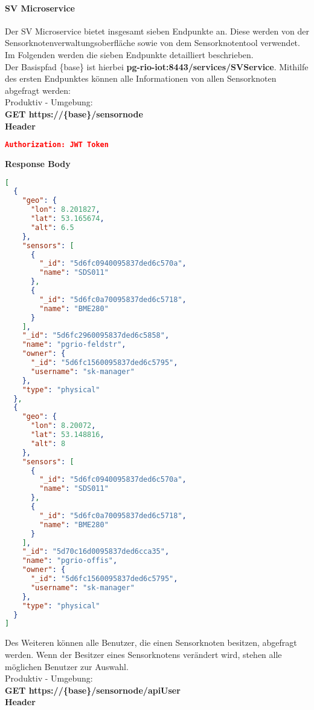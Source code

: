 \paragraph{SV Microservice}
Der SV Microservice bietet insgesamt sieben Endpunkte an.
Diese werden von der Sensorknotenverwaltungsoberfläche sowie von dem Sensorknotentool verwendet.
Im Folgenden werden die sieben Endpunkte detailliert beschrieben.
\\
Der Basispfad \{base\} ist hierbei \textbf{pg-rio-iot:8443/services/SVService}.
\newline
Mithilfe des ersten Endpunktes können alle Informationen von allen Sensorknoten abgefragt werden:
\\
Produktiv - Umgebung:
\\
\textbf{GET https://\{base\}/sensornode}
\\
\textbf{Header}
\begin{lstlisting}[language=json,firstnumber=1,basicstyle=\footnotesize]
Authorization: JWT Token
\end{lstlisting}
\textbf{Response Body}
\begin{lstlisting}[language=json,firstnumber=1,basicstyle=\footnotesize]
[
  {
    "geo": {
      "lon": 8.201827,
      "lat": 53.165674,
      "alt": 6.5
    },
    "sensors": [
      {
        "_id": "5d6fc0940095837ded6c570a",
        "name": "SDS011"
      },
      {
        "_id": "5d6fc0a70095837ded6c5718",
        "name": "BME280"
      }
    ],
    "_id": "5d6fc2960095837ded6c5858",
    "name": "pgrio-feldstr",
    "owner": {
      "_id": "5d6fc1560095837ded6c5795",
      "username": "sk-manager"
    },
    "type": "physical"
  },
  {
    "geo": {
      "lon": 8.20072,
      "lat": 53.148816,
      "alt": 8
    },
    "sensors": [
      {
        "_id": "5d6fc0940095837ded6c570a",
        "name": "SDS011"
      },
      {
        "_id": "5d6fc0a70095837ded6c5718",
        "name": "BME280"
      }
    ],
    "_id": "5d70c16d0095837ded6cca35",
    "name": "pgrio-offis",
    "owner": {
      "_id": "5d6fc1560095837ded6c5795",
      "username": "sk-manager"
    },
    "type": "physical"
  }
]
\end{lstlisting}
Des Weiteren können alle Benutzer, die einen Sensorknoten besitzen, abgefragt werden.
Wenn der Besitzer eines Sensorknotens verändert wird, stehen alle möglichen Benutzer zur Auswahl.
\\
Produktiv - Umgebung:
\\
\textbf{GET https://\{base\}/sensornode/apiUser}
\\
\textbf{Header}
